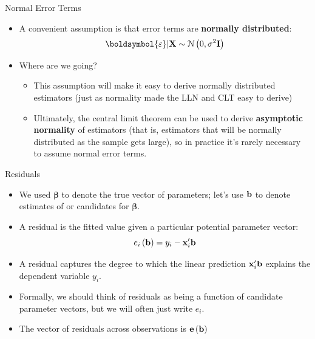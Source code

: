 \documentclass[aspectratio=169,11pt]{beamer}
\begin{document}
\begin{frame}{Normal Error Terms}
\begin{itemize}
	\item A convenient assumption 
	 is that error terms are {\bf normally distributed}:\[
		\boldsymbol{\varepsilon} | {\bf X} \sim \mathcal{N}\left(0,\sigma^2 {\bf I}\right)
	\]

	\medskip
	\item Where are we going?
	\begin{itemize}
		\item This assumption will make it easy to derive normally distributed estimators (just as
			normality made the LLN and CLT easy to derive)
		\item Ultimately, the central limit theorem can be used to derive {\bf asymptotic normality}
				of estimators (that is, estimators that will be normally distributed as the sample gets large),
				so in practice it's rarely necessary to assume normal error terms. 
	\end{itemize}

\end{itemize}
\end{frame}



\begin{frame}{Residuals}
\begin{itemize}
	\item We used $\boldsymbol{\beta}$ to denote the true vector of parameters; let's use
	${\bf b}$ to denote estimates of or candidates for $\boldsymbol{\beta}$.

	\item A residual is the fitted value given a particular potential parameter vector:\[
		e_i \left({\bf b}\right) = y_i - {\bf x}_i' {\bf b}
	\]

	\item A residual captures the degree to which the linear prediction ${\bf x}_i' {\bf b}$
	explains the dependent variable $y_{i}$.
	

	\item Formally, we should think of residuals as being a function of candidate parameter
	vectors, but we will often just write $e_i$. 


	\item The vector of residuals across observations is ${\bf e} \left({\bf b}\right)$
\end{itemize}
\end{frame}
\end{document}
